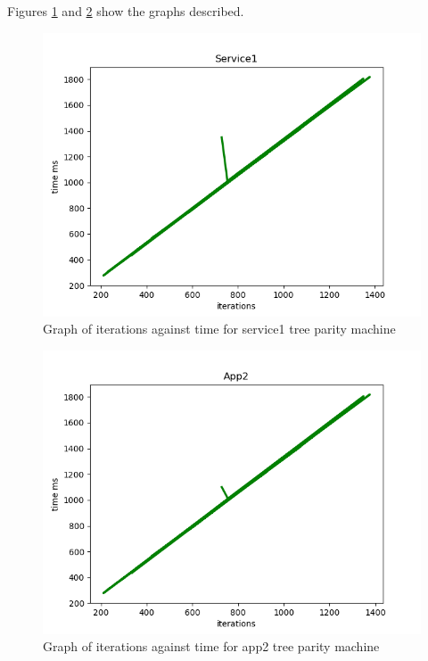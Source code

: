 Figures \ref{fig:sync_results_graph_service1} and \ref{fig:sync_results_graph_app2} show the graphs described.

\begin{figure}[!h]
	\centering
	\includegraphics[width=1\textwidth]{Figures/sync_results_graph_service1.png}
	\caption[Graph of iterations against time for service1 tree parity machine]{Graph of iterations against time for service1 tree parity machine}
	\label{fig:sync_results_graph_service1}
\end{figure}
\FloatBarrier

\begin{figure}[!h]
	\centering
	\includegraphics[width=1\textwidth]{Figures/sync_results_graph_app2.png}
	\caption[Graph of iterations against time for app2 tree parity machine]{Graph of iterations against time for app2 tree parity machine}
	\label{fig:sync_results_graph_app2}
\end{figure}
\FloatBarrier


